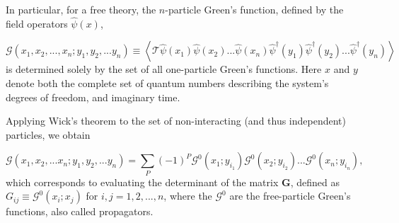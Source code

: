In particular, for a free theory, the $n$-particle Green's function, defined by the field operators $\hat{\psi} ( x )$,

\begin{equation}
\mathcal{G} ( x_1, x_2, ..., x_n; y_1, y_2, ... y_n ) \equiv \left\langle \mathcal{T} \hat{\psi} ( x_1 ) \hat{\psi} ( x_2 ) ... \hat{\psi} ( x_n ) \hat{\psi}^\dagger ( y_1 ) \hat{\psi}^\dagger ( y_2 ) ... \hat{\psi}^\dagger ( y_n ) \right\rangle
\end{equation}
is determined solely by the set of all one-particle Green's functions.
Here $x$ and $y$ denote both the complete set of quantum numbers describing the system's degrees of freedom, and imaginary time.

Applying Wick's theorem to the set of non-interacting (and thus independent) particles, we obtain

\begin{equation}
\mathcal{G} ( x_1, x_2, ... x_n; y_1, y_2,... y_n ) = \sum_P (- 1 )^P \mathcal{G}^0 ( x_1; y_{i_1} ) \mathcal{G}^0 ( x_2; y_{i_2} ) ... \mathcal{G}^0 ( x_n; y_{i_n} ) ,
\end{equation}
which corresponds to evaluating the determinant of the matrix $\bm G$, defined as $G_{ij} \equiv \mathcal{G}^0 ( x_i ; x_j )$ for $i, j = 1, 2, ..., n$, where the $\mathcal{G}^0$ are the free-particle Green's functions, also called propagators.